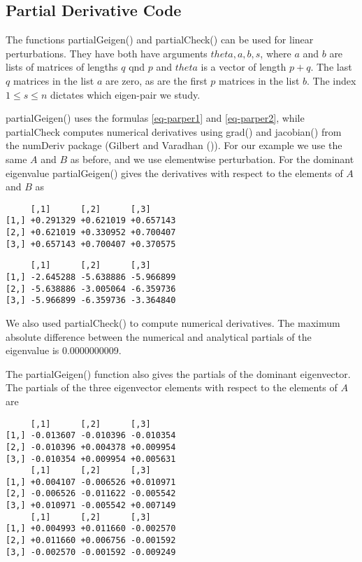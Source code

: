 \documentclass[
  12pt,
  letterpaper,
  DIV=11,
  numbers=noendperiod]{scrartcl}
\begin{document}
\subsection{Partial Derivative Code}\label{sec-partialcode}

The functions partialGeigen() and partialCheck() can be used for linear
perturbations. They have both have arguments \(theta, a, b, s\), where
\(a\) and \(b\) are lists of matrices of lengths \(q\) qnd \(p\) and
\(theta\) is a vector of length \(p+q\). The last \(q\) matrices in the
list \(a\) are zero, as are the first \(p\) matrices in the list \(b\).
The index \(1\leq s\leq n\) dictates which eigen-pair we study.

partialGeigen() uses the formulas \eqref{eq-parper1} and
\eqref{eq-parper2}, while partialCheck computes numerical derivatives
using grad() and jacobian() from the numDeriv package (Gilbert and
Varadhan ()). For our example we
use the same \(A\) and \(B\) as before, and we use elementwise
perturbation. For the dominant eigenvalue partialGeigen() gives the
derivatives with respect to the elements of \(A\) and \(B\) as

\begin{verbatim}
     [,1]      [,2]      [,3]     
[1,] +0.291329 +0.621019 +0.657143
[2,] +0.621019 +0.330952 +0.700407
[3,] +0.657143 +0.700407 +0.370575
\end{verbatim}

\begin{verbatim}
     [,1]      [,2]      [,3]     
[1,] -2.645288 -5.638886 -5.966899
[2,] -5.638886 -3.005064 -6.359736
[3,] -5.966899 -6.359736 -3.364840
\end{verbatim}

We also used partialCheck() to compute numerical derivatives. The
maximum absolute difference between the numerical and analytical
partials of the eigenvalue is 0.0000000009.

The partialGeigen() function also gives the partials of the dominant
eigenvector. The partials of the three eigenvector elements with respect
to the elements of \(A\) are

\begin{verbatim}
     [,1]      [,2]      [,3]     
[1,] -0.013607 -0.010396 -0.010354
[2,] -0.010396 +0.004378 +0.009954
[3,] -0.010354 +0.009954 +0.005631
     [,1]      [,2]      [,3]     
[1,] +0.004107 -0.006526 +0.010971
[2,] -0.006526 -0.011622 -0.005542
[3,] +0.010971 -0.005542 +0.007149
     [,1]      [,2]      [,3]     
[1,] +0.004993 +0.011660 -0.002570
[2,] +0.011660 +0.006756 -0.001592
[3,] -0.002570 -0.001592 -0.009249
\end{verbatim}
\end{document}
